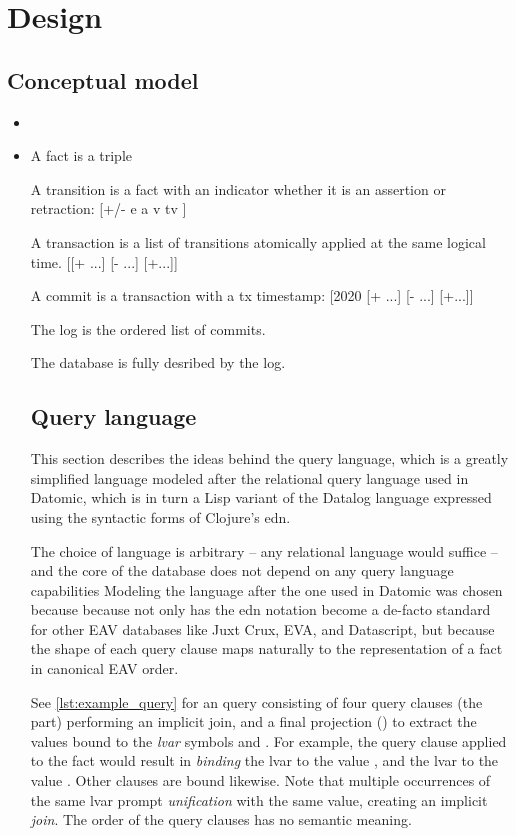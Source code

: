 \section{Design}\label{sec:design}







\subsection{Conceptual model}



\begin{itemize}
  \item
  \item A fact is a triple \lisp{[e a v]}

A transition is a fact with an indicator whether it is an assertion or retraction: [+/- e a v tv ]

A transaction is a list of transitions atomically applied at the same logical time. [[+ ...] [- ...] [+...]]

A commit is a transaction with a tx timestamp: [2020 [+ ...] [- ...] [+...]]

The log is the ordered list of commits.

The database is fully desribed by the log.




\subsection{Query language}

This section describes the ideas behind the query language, which is a greatly simplified language modeled after the relational query language used in Datomic, which is in turn a Lisp variant of the Datalog \cite{abiteboul1988datalog} language expressed using the syntactic forms of Clojure's \gls{edn}.

The choice of language is arbitrary -- any relational language would suffice -- and the core of the database does not depend on any query language capabilities Modeling the language after the one used in Datomic was chosen because because not only has the edn notation become a de-facto standard for other EAV databases like Juxt Crux, EVA, and Datascript, but because the shape of each query clause maps naturally to the representation of a fact in canonical EAV order.

See \autoref{lst:example_query} for an query consisting of four query clauses (the  part) performing an implicit join, and a final projection () to extract the values bound to the \emph{\gls{lvar}} symbols  and . For example, the query clause  applied to the fact  would result in \emph{binding} the lvar  to the value , and the lvar  to the value . Other clauses are bound likewise. Note that multiple occurrences of the same lvar prompt \emph{unification} with the same value, creating an implicit \emph{join}. The order of the query clauses has no semantic meaning.


\end{itemize}

